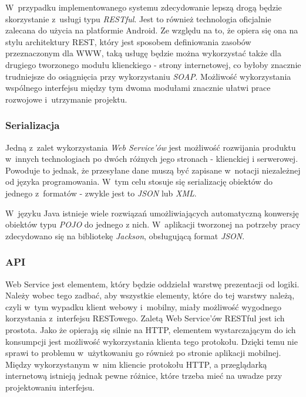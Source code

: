 \documentclass[11pt]{aghdpl}
\begin{document}
W~przypadku implementowanego systemu zdecydowanie lepszą drogą będzie skorzystanie z~usługi typu \emph{RESTful}. Jest to również technologia oficjalnie zalecana do użycia na platformie Android. Ze względu na to, że opiera się ona na stylu architektury REST, który jest sposobem definiowania zasobów przeznaczonym dla WWW, taką usługę będzie można wykorzystać także dla drugiego tworzonego modułu klienckiego - strony internetowej, co byłoby znacznie trudniejsze do osiągnięcia przy wykorzystaniu \emph{SOAP}. Możliwość wykorzystania wspólnego interfejsu między tym dwoma modułami znacznie ułatwi prace rozwojowe i~utrzymanie projektu.

\subsubsection{Serializacja}

Jedną z~zalet wykorzystania \emph{Web Service'ów} jest możliwość rozwijania produktu w~innych technologiach po dwóch różnych jego stronach - klienckiej i serwerowej. Powoduje to jednak, że przesyłane dane muszą być zapisane w~notacji niezależnej od języka programowania. W~tym celu stosuje się serializację obiektów do jednego z~formatów - zwykle jest to \emph{JSON} lub \emph{XML}.

W~języku Java istnieje wiele rozwiązań umożliwiających automatyczną konwersję obiektów typu \emph{POJO} do jednego z nich. W~aplikacji tworzonej na potrzeby pracy zdecydowano się na bibliotekę \emph{Jackson}, obsługującą format \emph{JSON}.

\subsubsection{API}

Web Service jest elementem, który będzie oddzielał warstwę prezentacji od logiki. Należy wobec tego zadbać, aby wszystkie elementy, które do tej warstwy należą, czyli w~tym wypadku klient webowy i~mobilny, miały możliwość wygodnego korzystania z~interfejsu RESTowego. Zaletą Web Service'ów RESTful jest ich prostota. Jako że opierają się silnie na HTTP, elementem wystarczającym do ich konsumpcji jest możliwość wykorzystania klienta tego protokołu. Dzięki temu nie sprawi to problemu w~użytkowaniu go również po stronie aplikacji mobilnej. Między wykorzystanym w~nim kliencie protokołu HTTP, a przeglądarką internetową istnieją jednak pewne różnice, które trzeba mieć na uwadze przy projektowaniu interfejsu.
\end{document}
